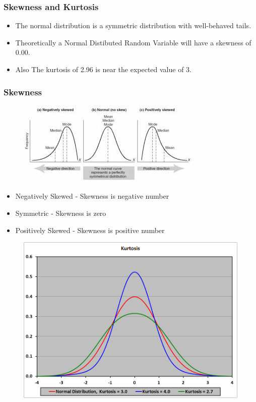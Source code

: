 \documentclass{beamer}
\begin{document}
\begin{frame}
\frametitle{Skewness and Kurtosis}
\large
\begin{itemize}
\item	The normal distribution is a symmetric distribution with well-behaved tails. 
\item Theoretically a Normal Distibuted Random Variable will have a skewness of 0.00. 
\item	Also The kurtosis of 2.96 is near the expected value of 3.
\end{itemize}

\end{frame}
\begin{frame}
\frametitle{Skewness}
	\begin{figure}
\centering
\includegraphics[width=0.85\linewidth]{images/skewness2}
\end{figure}
\begin{itemize}
\item Negatively Skewed  - Skewness is negative number
\item Symmetric  - Skewness is zero
\item Positively Skewed - Skewness is positive number
\end{itemize}
\end{frame}
\begin{frame}
	\begin{figure}
\centering
\includegraphics[width=0.7\linewidth]{images/Kurtosis-Chart}
\caption{}
\label{fig:Kurtosis-Chart}
\end{figure}

\end{frame}
\end{document}
